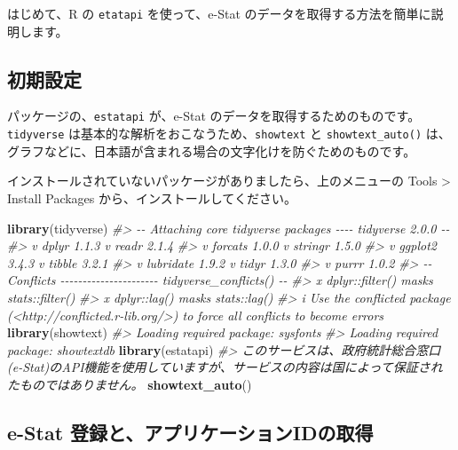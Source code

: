 \documentclass[
  xelatex, ja=standard]{bxjsbook}
\newenvironment{Shaded}{\begin{snugshade}}{\end{snugshade}}
\newcommand{\CommentTok}[1]{\textcolor[rgb]{0.56,0.35,0.01}{\textit{#1}}}
\newcommand{\FunctionTok}[1]{\textcolor[rgb]{0.13,0.29,0.53}{\textbf{#1}}}
\newcommand{\NormalTok}[1]{#1}
\theoremstyle{definition}
\theoremstyle{definition}
\theoremstyle{definition}
\theoremstyle{definition}
\theoremstyle{remark}
\begin{document}
はじめて、R の \texttt{etatapi} を使って、e-Stat のデータを取得する方法を簡単に説明します。

\hypertarget{ux521dux671fux8a2dux5b9a}{%
\subsection*{初期設定}\label{ux521dux671fux8a2dux5b9a}}

パッケージの、\texttt{estatapi} が、e-Stat のデータを取得するためのものです。\texttt{tidyverse} は基本的な解析をおこなうため、\texttt{showtext} と \texttt{showtext\_auto()} は、グラフなどに、日本語が含まれる場合の文字化けを防ぐためのものです。

インストールされていないパッケージがありましたら、上のメニューの Tools \textgreater{} Install Packages から、インストールしてください。

\begin{Shaded}
\begin{Highlighting}[]
\FunctionTok{library}\NormalTok{(tidyverse)}
\CommentTok{\#\textgreater{} {-}{-} Attaching core tidyverse packages {-}{-}{-}{-} tidyverse 2.0.0 {-}{-}}
\CommentTok{\#\textgreater{} v dplyr     1.1.3     v readr     2.1.4}
\CommentTok{\#\textgreater{} v forcats   1.0.0     v stringr   1.5.0}
\CommentTok{\#\textgreater{} v ggplot2   3.4.3     v tibble    3.2.1}
\CommentTok{\#\textgreater{} v lubridate 1.9.2     v tidyr     1.3.0}
\CommentTok{\#\textgreater{} v purrr     1.0.2     }
\CommentTok{\#\textgreater{} {-}{-} Conflicts {-}{-}{-}{-}{-}{-}{-}{-}{-}{-}{-}{-}{-}{-}{-}{-}{-}{-}{-}{-}{-}{-} tidyverse\_conflicts() {-}{-}}
\CommentTok{\#\textgreater{} x dplyr::filter() masks stats::filter()}
\CommentTok{\#\textgreater{} x dplyr::lag()    masks stats::lag()}
\CommentTok{\#\textgreater{} i Use the conflicted package (\textless{}http://conflicted.r{-}lib.org/\textgreater{}) to force all conflicts to become errors}
\FunctionTok{library}\NormalTok{(showtext)}
\CommentTok{\#\textgreater{} Loading required package: sysfonts}
\CommentTok{\#\textgreater{} Loading required package: showtextdb}
\FunctionTok{library}\NormalTok{(estatapi)}
\CommentTok{\#\textgreater{} このサービスは、政府統計総合窓口(e{-}Stat)のAPI機能を使用していますが、サービスの内容は国によって保証されたものではありません。}
\FunctionTok{showtext\_auto}\NormalTok{()}
\end{Highlighting}
\end{Shaded}

\hypertarget{e-stat-ux767bux9332ux3068ux30a2ux30d7ux30eaux30b1ux30fcux30b7ux30e7ux30f3idux306eux53d6ux5f97}{%
\subsection{e-Stat 登録と、アプリケーションIDの取得}\label{e-stat-ux767bux9332ux3068ux30a2ux30d7ux30eaux30b1ux30fcux30b7ux30e7ux30f3idux306eux53d6ux5f97}}
\end{document}
